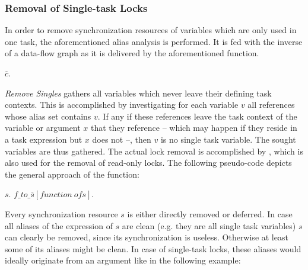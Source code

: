 \subsubsection{Removal of Single-task Locks}
In order to remove synchronization resources of variables which are only used in one task, the aforementioned alias analysis is performed. It is fed with the inverse of a data-flow graph as it is delivered by the aforementioned function. 
\begin{algorithmic}
 
    \State $\overline{c}$. 
  \EndIf
\EndFor
\State {}
\EndFunction
\end{algorithmic}
\textit{Remove Singles} gathers all variables which never leave their defining task contexts. This is accomplished by investigating for each variable $v$ all references whose alias set contains $v$. If any if these references leave the task context of the variable or argument $x$ that they reference -- which may happen if they reside in a task expression but $x$ does not --, then $v$ is no single task variable. The sought variables are thus gathered. The actual lock removal is accomplished by , which is also used for the removal of read-only locks. The following pseudo-code depicts the general approach of the function:
\begin{algorithmic}
 
   
    \State $s$.
  \Else
    \State $\mathit{f\_to\_\overline{s}}[\mathit{function\ of }s]$. 
  \EndIf
\EndFor

  \State {}
\EndFor

\EndFunction
\end{algorithmic}
Every synchronization resource $s$ is either directly removed or deferred. In case all aliases of the expression of $s$ are clean (e.g. they are all single task variables) $s$ can clearly be removed, since its synchronization is useless. Otherwise at least some of its aliases might be clean. In case of single-task locks, these aliases would ideally originate from an argument like in the following example:
